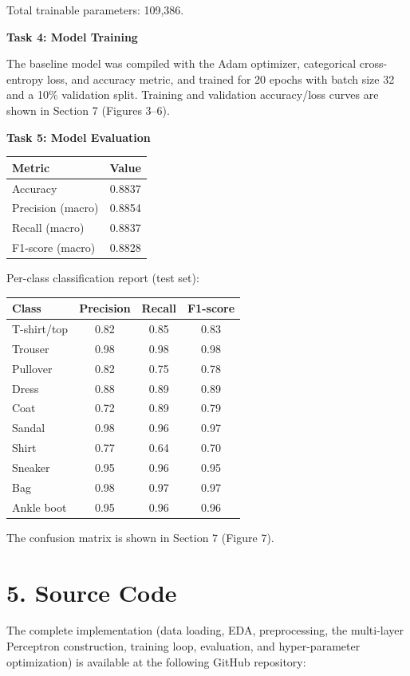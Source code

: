 \documentclass[11pt]{article}
\begin{document}
Total trainable parameters: 109,386.

\bigskip

\textbf{Task 4: Model Training}

The baseline model was compiled with the Adam optimizer, categorical cross-entropy loss, and accuracy metric, and trained for 20 epochs with batch size 32 and a 10\% validation split. Training and validation accuracy/loss curves are shown in Section 7 (Figures 3--6).

\bigskip

\textbf{Task 5: Model Evaluation}

\begin{center}
\begin{tabular}{|l|c|}
\hline
Metric & Value\\
\hline
Accuracy & 0.8837\\
Precision (macro) & 0.8854\\
Recall (macro) & 0.8837\\
F1-score (macro) & 0.8828\\
\hline
\end{tabular}
\end{center}

Per-class classification report (test set):

\begin{center}
\begin{tabular}{|l|c|c|c|}
\hline
Class & Precision & Recall & F1-score\\
\hline
T-shirt/top & 0.82 & 0.85 & 0.83\\
Trouser & 0.98 & 0.98 & 0.98\\
Pullover & 0.82 & 0.75 & 0.78\\
Dress & 0.88 & 0.89 & 0.89\\
Coat & 0.72 & 0.89 & 0.79\\
Sandal & 0.98 & 0.96 & 0.97\\
Shirt & 0.77 & 0.64 & 0.70\\
Sneaker & 0.95 & 0.96 & 0.95\\
Bag & 0.98 & 0.97 & 0.97\\
Ankle boot & 0.95 & 0.96 & 0.96\\
\hline
\end{tabular}
\end{center}

The confusion matrix is shown in Section 7 (Figure 7).

\section*{5. Source Code}
The complete implementation (data loading, EDA, preprocessing, the multi-layer Perceptron construction, training loop, evaluation, and hyper-parameter optimization) is available at the following GitHub repository:
\end{document}
